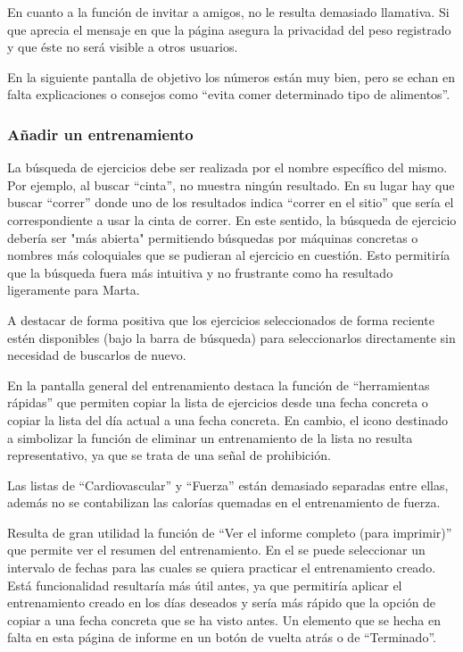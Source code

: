 \documentclass[a4paper]{article}
\begin{document}
			En cuanto a la función de invitar a amigos, no le resulta demasiado llamativa. Si que aprecia el mensaje en que la página asegura la privacidad del peso registrado y que éste no será visible a otros usuarios.
			
			En la siguiente pantalla de objetivo los números están muy bien, pero se echan en falta explicaciones o consejos como ``evita comer determinado tipo de alimentos''.
			
			\subsubsection*{Añadir un entrenamiento}
			
			La búsqueda de ejercicios debe ser realizada por el nombre específico del mismo. Por ejemplo, al buscar ``cinta'', no muestra ningún resultado. En su lugar hay que buscar ``correr'' donde uno de los resultados indica ``correr en el sitio'' que sería el correspondiente a usar la cinta de correr. En este sentido, la búsqueda de ejercicio debería ser "más abierta" permitiendo búsquedas por máquinas concretas o nombres más coloquiales que se pudieran al ejercicio en cuestión. Esto permitiría que la búsqueda fuera más intuitiva y no frustrante como ha resultado ligeramente para Marta.
			
			A destacar de forma positiva que los ejercicios seleccionados de forma reciente estén disponibles (bajo la barra de búsqueda) para seleccionarlos directamente sin necesidad de buscarlos de nuevo.
			
			En la pantalla general del entrenamiento destaca la función de ``herramientas rápidas'' que permiten copiar la lista de ejercicios desde una fecha concreta o copiar la lista del día actual a una fecha concreta. En cambio, el icono destinado a simbolizar la función de eliminar un entrenamiento de la lista no resulta representativo, ya que se trata de una señal de prohibición.
			
			Las listas de ``Cardiovascular'' y ``Fuerza'' están demasiado separadas entre ellas, además no se contabilizan las calorías quemadas en el entrenamiento de fuerza.
			
			Resulta de gran utilidad la función de ``Ver el informe completo (para imprimir)'' que permite ver el resumen del entrenamiento. En el se puede seleccionar un intervalo de fechas para las cuales se quiera practicar el entrenamiento creado. Está funcionalidad resultaría más útil antes, ya que permitiría aplicar el entrenamiento creado en los días deseados y sería más rápido que la opción de copiar a una fecha concreta que se ha visto antes. Un elemento que se hecha en falta en esta página de informe en un botón de vuelta atrás o de ``Terminado''.
			
\end{document}
